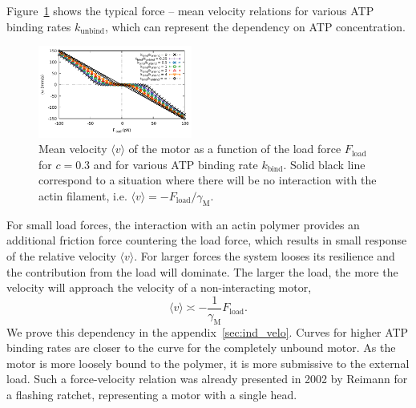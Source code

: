 \documentclass[aps,pre,twocolumn,showpacs,showkeys,superscriptaddress,floatfix]{revtex4-1}
\begin{document}
Figure~\ref{fig:F_v} shows the typical force -- mean velocity relations for various ATP binding rates $k_\text{unbind}$, which can represent the dependency on ATP concentration.
\begin{figure}[t]
\centering
\includegraphics[width=0.45\textwidth,height=!]{F_v}
\caption{
\label{fig:F_v} 
Mean velocity $\langle v \rangle$ of the motor as a function of the load force $F_\text{load}$ for $c=0.3$ and for various ATP binding rate $k_\text{bind}$.
Solid black line correspond to a situation where there will be no interaction with the actin filament, i.e. $\langle v \rangle = - F_\text{load} / \gamma_\text{M}$. 
}
\end{figure}
For small load forces, the interaction with an actin polymer provides an additional friction force countering the load force, 
which results in small response of the relative velocity $\langle v \rangle$.
For larger forces the system looses its resilience and the contribution from the load will dominate. 
The larger the load, the more the velocity will approach the velocity of a non-interacting motor, 
\[
\langle v \rangle \asymp - \frac{1}{\gamma_\text{M}} F_\text{load}.
\]
We prove this dependency in the appendix~\ref{sec:ind_velo}. 
Curves for higher ATP binding rates are closer to the curve for the completely unbound motor.
As the motor is more loosely bound to the polymer, it is more submissive to the external load.
Such a force-velocity relation was already presented in 2002 by Reimann \cite{reimann2002brownian} for a flashing ratchet, representing a motor with a single head.
\end{document}
